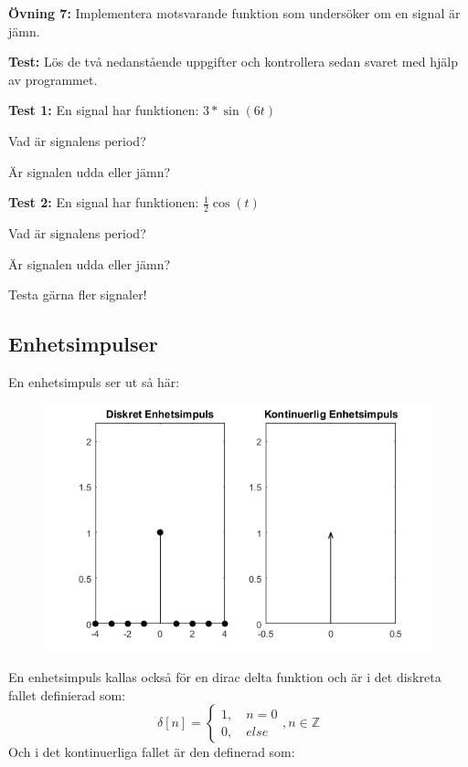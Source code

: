 \documentclass{article}
\begin{document}
\textbf{Övning 7:} Implementera motsvarande funktion som undersöker
om en signal är jämn.

\textbf{Test:} Lös de två nedanstående uppgifter och kontrollera sedan svaret med
hjälp av programmet.

\textbf{Test 1:}
En signal har funktionen: $3*\sin(6t)$

Vad är signalens period?

Är signalen udda eller jämn?

\textbf{Test 2:}
En signal har funktionen: $\frac{1}{2} \cos(t)$

Vad är signalens period?

Är signalen udda eller jämn?

Testa gärna fler signaler!

\subsection{Enhetsimpulser}
En enhetsimpuls ser ut så här:


\begin{figure}[ht]
\centerline{\includegraphics[scale=0.50]{delta.png}}

\caption{}
\label{}
\end{figure}

En enhetsimpuls kallas också för en dirac delta funktion och är i det
diskreta fallet definierad som:
$$
\delta[n]=
\begin{cases}
    1,\quad n = 0 \\
    0, \quad else
\end{cases}, n \in \mathbb{Z}
$$
Och i det kontinuerliga fallet är den definerad som:
\end{document}
